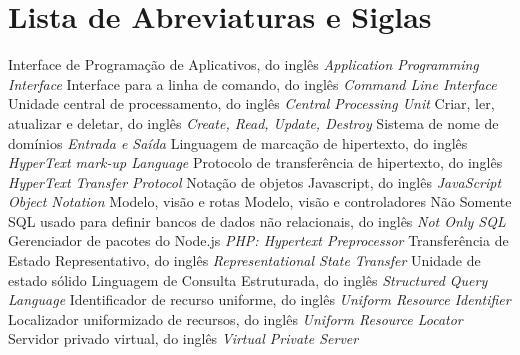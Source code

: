 \chapter*{Lista de Abreviaturas e Siglas}


\begin{acronym}
 {Interface de Programação de Aplicativos, do inglês \textit{Application Programming Interface}}
 {Interface para a linha de comando, do inglês \textit{Command Line Interface}}
 {Unidade central de processamento, do inglês \textit{Central Processing Unit}}
 {Criar, ler, atualizar e deletar, do inglês \textit{Create, Read, Update, Destroy}}
 {Sistema de nome de domínios}
 {\textit{Entrada e Saída}}
 {Linguagem de marcação de hipertexto, do inglês \textit{HyperText mark-up Language}}
 {Protocolo de transferência de hipertexto, do inglês \textit{HyperText Transfer Protocol}}
 {Notação de objetos Javascript, do inglês \textit{JavaScript Object Notation}}
 {Modelo, visão e rotas}
 {Modelo, visão e controladores}
 {Não Somente SQL usado para definir bancos de dados não relacionais, do inglês \textit{Not Only SQL}}
 {Gerenciador de pacotes do Node.js}
 {\textit{PHP: Hypertext Preprocessor}}
 {Transferência de Estado Representativo, do inglês \textit{Representational State Transfer}}
 {Unidade de estado sólido}
 {Linguagem de Consulta Estruturada, do inglês \textit{Structured Query Language}}
 {Identificador de recurso uniforme, do inglês \textit{Uniform Resource Identifier}}
 {Localizador uniformizado de recursos, do inglês \textit{Uniform Resource Locator}}
 {Servidor privado virtual, do inglês \textit{Virtual Private Server}}




\end{acronym}
